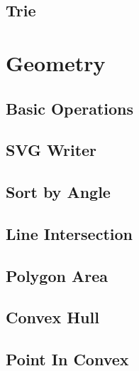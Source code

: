 \documentclass[a4paper,10pt,twocolumn,oneside,x11names]{article}
\begin{document}
\subsection{Trie}


% 

\section{Geometry}

\subsection{Basic Operations}


\subsection{SVG Writer}

\subsection{Sort by Angle}


\subsection{Line Intersection}


\subsection{Polygon Area}


\subsection{Convex Hull}


\subsection{Point In Convex}

\end{document}
